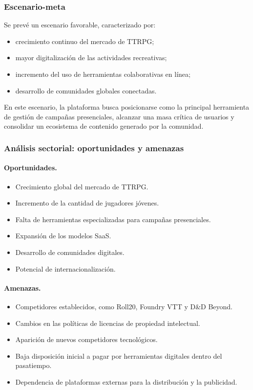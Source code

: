 \subsubsection{Escenario-meta}
Se prevé un escenario favorable, caracterizado por:
\begin{itemize}
  \item crecimiento continuo del mercado de TTRPG;
  \item mayor digitalización de las actividades recreativas;
  \item incremento del uso de herramientas colaborativas en línea;
  \item desarrollo de comunidades globales conectadas.
\end{itemize}
En este escenario, la plataforma busca posicionarse como la principal herramienta de gestión de campañas presenciales, alcanzar una masa crítica de usuarios y consolidar un ecosistema de contenido generado por la comunidad.

\subsubsection{Análisis sectorial: oportunidades y amenazas}\label{sec:oportunidades-amenazas}
\paragraph{Oportunidades.}
\begin{itemize}
  \item Crecimiento global del mercado de TTRPG.
  \item Incremento de la cantidad de jugadores jóvenes.
  \item Falta de herramientas especializadas para campañas presenciales.
  \item Expansión de los modelos SaaS.
  \item Desarrollo de comunidades digitales.
  \item Potencial de internacionalización.
\end{itemize}

\paragraph{Amenazas.}
\begin{itemize}
  \item Competidores establecidos, como Roll20, Foundry VTT y D\&D Beyond.
  \item Cambios en las políticas de licencias de propiedad intelectual.
  \item Aparición de nuevos competidores tecnológicos.
  \item Baja disposición inicial a pagar por herramientas digitales dentro del pasatiempo.
  \item Dependencia de plataformas externas para la distribución y la publicidad.
\end{itemize}

